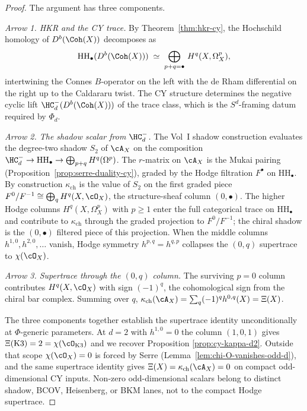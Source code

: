\begin{proof}
The argument has three components.

\emph{Arrow 1. HKR and the CY trace.} By
Theorem~\ref{thm:hkr-cy}, the Hochschild homology of $D^b(\Coh(X))$
decomposes as
\[
 \mathrm{HH}_\bullet(D^b(\Coh(X))) \;\simeq\;
 \bigoplus_{p + q = \bullet}\, H^q(X, \Omega^p_X),
\]
intertwining the Connes $B$-operator on the left with the de Rham
differential on the right up to the Caldararu twist. The CY structure
determines the negative cyclic lift $\HC^-_d(D^b(\Coh(X)))$ of the
trace class, which is the $S^d$-framing datum required by
$\Phi_d$.

\emph{Arrow 2. The shadow scalar from $\HC^-_d$.} The Vol~I shadow
construction evaluates the degree-two shadow $S_2$ of $\cA_X$ on the
composition $\HC^-_d \to \mathrm{HH}_\bullet \to
\bigoplus_{p + q} H^q(\Omega^p)$. The $r$-matrix on $\cA_X$ is the
Mukai pairing (Proposition~\ref{prop:serre-duality-cy}), graded by the
Hodge filtration $F^\bullet$ on $\mathrm{HH}_\bullet$. By construction
$\kappa_{\mathrm{ch}}$ is the value of $S_2$ on the first graded piece
$F^0 / F^{-1} \cong \bigoplus_q H^q(X, \cO_X)$, the structure-sheaf
column $(0, \bullet)$. The higher Hodge columns $H^q(X, \Omega^p_X)$
with $p \geq 1$ enter the full categorical trace on $\mathrm{HH}_\bullet$
and contribute to $\kappa_{\mathrm{ch}}$ through the graded projection
to $F^0 / F^{-1}$; the chiral shadow is the $(0, \bullet)$ filtered
piece of this projection. When the middle columns
$h^{1, 0}, h^{2, 0}, \ldots$ vanish, Hodge symmetry $h^{p, q} = h^{q, p}$
collapses the $(0, q)$ supertrace to $\chi(\cO_X)$.

\emph{Arrow 3. Supertrace through the $(0,q)$ column.} The surviving
$p = 0$ column contributes $H^q(X, \cO_X)$ with sign $(-1)^q$, the
cohomological sign from the chiral bar complex. Summing over $q$,
$\kappa_{\mathrm{ch}}(\cA_X) = \sum_q (-1)^q h^{0,q}(X) = \Xi(X)$.

The three components together establish the supertrace identity
unconditionally at $\Phi$-generic parameters. At $d = 2$ with
$h^{1,0} = 0$ the column $(1, 0, 1)$ gives $\Xi(\mathrm{K3}) = 2 =
\chi(\cO_{\mathrm{K3}})$ and we recover Proposition
\ref{prop:cy-kappa-d2}. Outside that scope $\chi(\cO_X) = 0$ is forced
by Serre (Lemma~\ref{lem:chi-O-vanishes-odd-d}), and the same
supertrace identity gives
$\Xi(X)=\kappa_{\mathrm{ch}}(\cA_X)=0$ on compact odd-dimensional CY
inputs.  Non-zero odd-dimensional scalars belong to distinct shadow,
BCOV, Heisenberg, or BKM lanes, not to the compact Hodge supertrace.
\end{proof}

